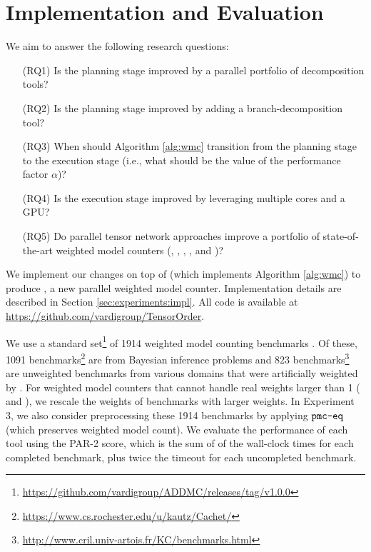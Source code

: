 \section{Implementation and Evaluation}
\label{sec:experiments}

We aim to answer the following research questions:

\begin{enumerate}\itemsep0em 
    \item[(RQ1)] Is the planning stage improved by a parallel portfolio of decomposition tools?
    
    \item[(RQ2)] Is the planning stage improved by adding a branch-decomposition tool?
    
    \item[(RQ3)] When should Algorithm \ref{alg:wmc} transition from the planning stage to the execution stage (i.e., what should be the value of the performance factor $\alpha$)?
    
    \item[(RQ4)] Is the execution stage improved by leveraging multiple cores and a GPU?
    
    \item[(RQ5)] Do parallel tensor network approaches improve a portfolio of state-of-the-art weighted model counters (, , , , and )?
\end{enumerate}

We implement our changes on top of  \cite{DDV19} (which implements Algorithm \ref{alg:wmc}) to produce , a new parallel weighted model counter. Implementation details are described in Section \ref{sec:experiments:impl}. All code is available at  \url{https://github.com/vardigroup/TensorOrder}.

We use a standard set\footnote{\url{https://github.com/vardigroup/ADDMC/releases/tag/v1.0.0}} of 1914 weighted model counting benchmarks \cite{DPV20}. Of these, 1091 benchmarks\footnote{\url{https://www.cs.rochester.edu/u/kautz/Cachet/}} are from Bayesian inference problems \cite{SBK05} and 823 benchmarks\footnote{\url{http://www.cril.univ-artois.fr/KC/benchmarks.html}} are unweighted benchmarks from various domains that were artificially weighted by \cite{DPV20}. For weighted model counters that cannot handle real weights larger than 1 ( and ), we rescale the weights of benchmarks with larger weights. In Experiment 3, we also consider preprocessing these 1914 benchmarks by applying $\texttt{\upshape pmc-eq}$ \cite{LM14} (which preserves weighted model count). %
We evaluate the performance of each tool using the PAR-2 score, which is the sum of of the wall-clock times for each completed benchmark, plus twice the timeout for each uncompleted benchmark.

